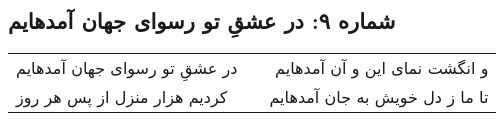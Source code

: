\begin{center}
\section*{شماره ۹: در عشقِ تو رسوای جهان آمدهایم}
\label{sec:009}
\begin{longtable}{l p{0.5cm} r}
در عشقِ تو رسوای جهان آمدهایم
&&
و انگشت نمای این و آن آمدهایم
\\
کردیم هزار منزل از پس هر روز
&&
تا ما ز دل خویش به جان آمدهایم
\\
\end{longtable}
\end{center}
